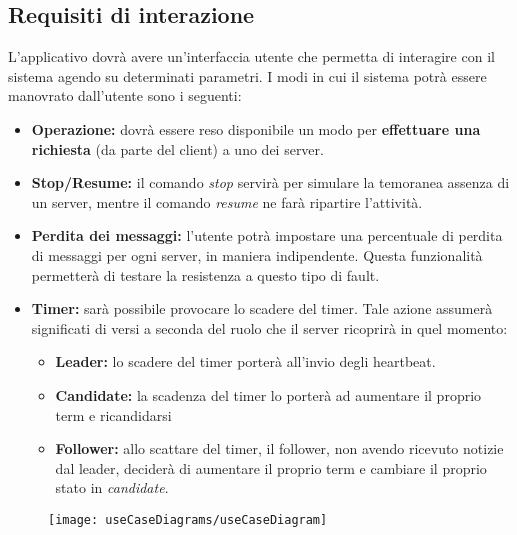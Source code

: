 	\subsection{Requisiti di interazione}
	L'applicativo dovrà avere un'interfaccia utente che permetta di interagire con il sistema agendo su determinati parametri. I modi in cui il sistema potrà essere manovrato dall'utente sono i seguenti:
		\begin{itemize}
			\item \textbf{Operazione:} dovrà essere reso disponibile un modo per \textbf{effettuare una richiesta} (da parte del client) a uno dei server.
			\item \textbf{Stop/Resume:} il comando \textit{stop} servirà per simulare la temoranea assenza di un server, mentre il comando \textit{resume} ne farà ripartire l'attività. 
			\item \textbf{Perdita dei messaggi:} l'utente potrà impostare una percentuale di perdita di messaggi per ogni server, in maniera indipendente. Questa funzionalità permetterà di testare la resistenza a questo tipo di fault.
			\item \textbf{Timer:} sarà possibile provocare lo scadere del timer. Tale azione assumerà significati di versi a seconda del ruolo che il server ricoprirà in quel momento:
				\begin{itemize}
					\item \textbf{Leader:} lo scadere del timer porterà all'invio degli heartbeat.
					\item \textbf{Candidate:} la scadenza del timer lo porterà ad aumentare il proprio term e ricandidarsi
					\item \textbf{Follower:} allo scattare del timer, il follower, non avendo ricevuto notizie dal leader, deciderà di aumentare il proprio term e cambiare il proprio stato in \textit{candidate}.
				\end{itemize}

		\end{itemize}


\begin{figure}[H]
  \centering
  \texttt{[image: useCaseDiagrams/useCaseDiagram]}
  \caption[useCaseDiagramCaption]{}
  
  \label{fig:figure28}
\end{figure}